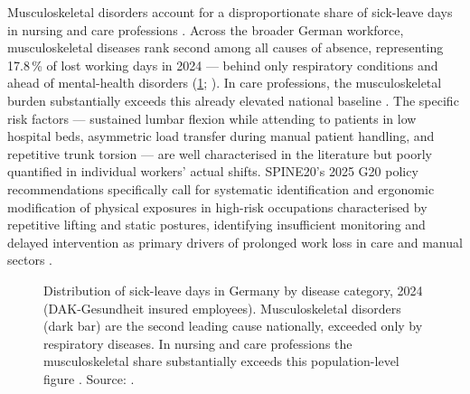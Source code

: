 Musculoskeletal disorders account for a disproportionate share of sick-leave days in
nursing and care professions \cite{sun2023}.
Across the broader German workforce, musculoskeletal diseases rank second among all
causes of absence, representing 17.8\,\% of lost working days in 2024 --- behind only
respiratory conditions and ahead of mental-health disorders
(\cref{fig:au-causes}; \cite{dak2025}).
In care professions, the musculoskeletal burden substantially exceeds this already
elevated national baseline \cite{sun2023}.
The specific risk factors --- sustained lumbar flexion while attending to patients in
low hospital beds, asymmetric load transfer during manual patient handling, and
repetitive trunk torsion --- are well characterised in the literature but poorly
quantified in individual workers' actual shifts.
SPINE20's 2025 G20 policy recommendations specifically call for systematic
identification and ergonomic modification of physical exposures in high-risk
occupations characterised by repetitive lifting and static postures, identifying
insufficient monitoring and delayed intervention as primary drivers of prolonged
work loss in care and manual sectors \cite{spine20_2025}.

\begin{figure}[ht]
	\centering
	\caption{Distribution of sick-leave days in Germany by disease category, 2024
		(DAK-Gesundheit insured employees).
		Musculoskeletal disorders (dark bar) are the second leading cause nationally,
		exceeded only by respiratory diseases.
		In nursing and care professions the musculoskeletal share substantially exceeds
		this population-level figure \cite{sun2023}.
		Source: \cite{dak2025}.}
	\label{fig:au-causes}
\end{figure}

